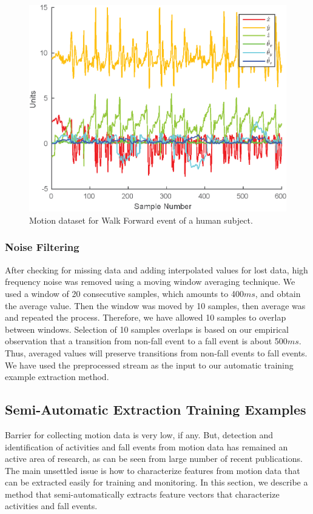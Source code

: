 \documentclass{IEEEtran}
\begin{document}
\begin{figure}[htb]
	\centering
		\includegraphics[width=0.95\columnwidth]{plots/human_walk-crop.eps}
	\caption{Motion dataset for Walk Forward event of a human subject. }
	\label{fig:human_walk_forward-crop}
\end{figure}


\subsubsection{Noise Filtering}
\label{sec:NoiseFiltering}

After checking for missing data and adding interpolated values for lost data,  high frequency noise was removed using a moving window averaging technique. We used a window  of 20 consecutive samples, which amounts to 400$ms$, 
and obtain the average value. Then the  window was moved by 10 samples, then average was and 
repeated the process. Therefore, we have allowed 10 samples to overlap between windows. 
Selection of 10 samples overlaps is based on our empirical observation that a transition from non-fall event to a fall event is about 500$ms$. Thus, averaged values will preserve transitions from non-fall events to fall events.   We have used the preprocessed stream as the input to our automatic training example 
extraction method.


\subsection{Semi-Automatic  Extraction Training Examples}

Barrier for collecting motion data is very low, if any. But, detection and identification of activities and fall events from motion data has remained an active area of research, as can be seen from large number of recent publications. The main unsettled issue is how to characterize features from motion data that can be extracted easily for training and monitoring. In this section, we describe a method that semi-automatically extracts feature vectors that characterize activities and fall events.
\end{document}
